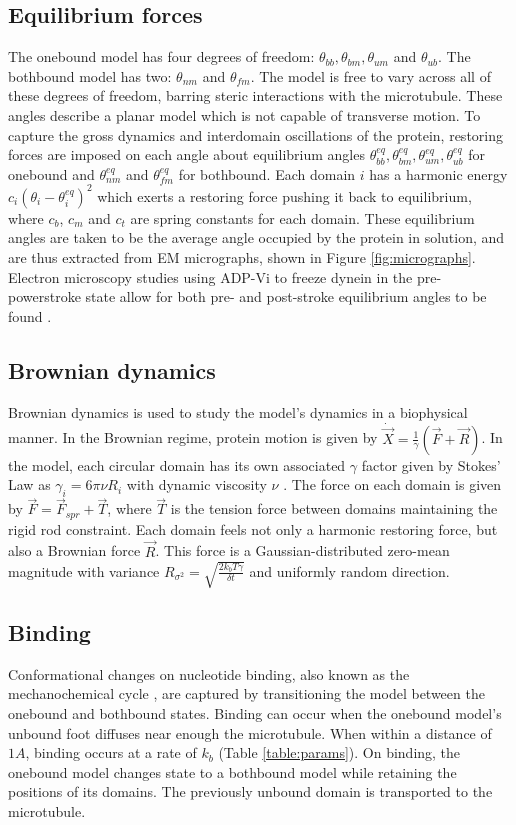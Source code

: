 \documentclass[9pt,twocolumn,twoside]{pnas-new}
\begin{document}
\subsection*{Equilibrium forces}
The onebound model has four degrees of freedom: $\theta_{bb}, \theta_{bm}, \theta_{um}$ and $\theta_{ub}$. The bothbound model has two: $\theta_{nm}$ and $\theta_{fm}$. The model is free to vary across all of these degrees of freedom, barring steric interactions with the microtubule. These angles describe a planar model which is not capable of transverse motion. To capture the gross dynamics and interdomain oscillations of the protein, restoring forces are imposed on each angle about equilibrium angles $\theta^{eq}_{bb}, \theta^{eq}_{bm}, \theta^{eq}_{um}, \theta^{eq}_{ub}$ for onebound and $\theta^{eq}_{nm}$ and $\theta^{eq}_{fm}$ for bothbound. Each domain $i$ has a harmonic energy $c_i\left(\theta_i-\theta^{eq}_i\right)^2$ which exerts a restoring force pushing it back to equilibrium, where $c_b$, $c_m$ and $c_t$ are spring constants for each domain. These equilibrium angles are taken to be the average angle occupied by the protein in solution, and are thus extracted from EM micrographs, shown in Figure \ref{fig:micrographs}. Electron microscopy studies using ADP-Vi to freeze dynein in the pre-powerstroke state allow for both pre- and post-stroke equilibrium angles to be found \cite{burgess-paper}.\\

\subsection*{Brownian dynamics}
Brownian dynamics is used to study the model's dynamics in a biophysical manner. In the Brownian regime, protein motion is given by $\dot{\vec{X}} = \frac{1}{\gamma}\left(\vec{F}+\vec{R}\right)$. In the model, each circular domain has its own associated $\gamma$ factor given by Stokes' Law as $\gamma_i = 6\pi\nu R_i$ with dynamic viscosity $\nu$ \cite{stokeslaw}. The force on each domain is given by $\vec{F} = \vec{F}_{spr} + \vec{T}$, where $\vec{T}$ is the tension force between domains maintaining the rigid rod constraint. Each domain feels not only a harmonic restoring force, but also a Brownian force $\vec{R}$. This force is a Gaussian-distributed zero-mean magnitude with variance $R_{\sigma^2} = \sqrt{\frac{2k_bT\gamma}{\delta t}}$ \cite{einstein} and uniformly random direction.

\subsection*{Binding}
Conformational changes on nucleotide binding, also known as the mechanochemical cycle \cite{cianfrocco}, are captured by transitioning the model between the onebound and bothbound states. Binding can occur when the onebound model's unbound foot diffuses near enough the microtubule. When within a distance of $1 A$, binding occurs at a rate of $k_b$ (Table \ref{table:params}). On binding, the onebound model changes state to a bothbound model while retaining the positions of its domains. The previously unbound domain is transported to the microtubule.
\end{document}
